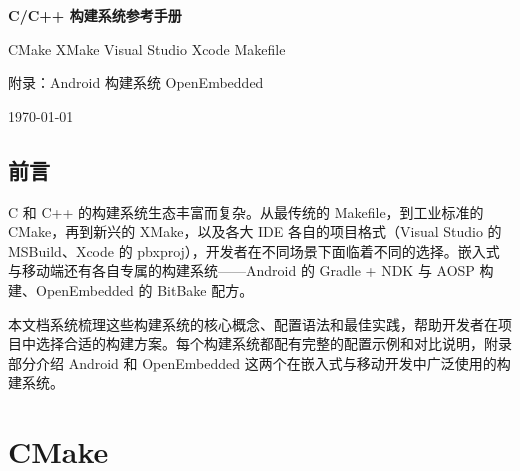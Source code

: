 \documentclass[12pt,a4paper,fontset=fandol]{ctexbook}
\begin{document}
\frontmatter

\begin{titlepage}
\centering
\vspace*{3cm}
{\Huge\bfseries\color{algheadbg} C/C++ 构建系统参考手册\par}
\vspace{1cm}
{\LARGE\color{blue!70!black} CMake \textbullet{} XMake \textbullet{} Visual Studio \textbullet{} Xcode \textbullet{} Makefile\par}
\vspace{0.8cm}
{\Large\color{gray} 附录：Android 构建系统 \textbullet{} OpenEmbedded\par}
\vfill
{\large\color{gray} \today\par}
\end{titlepage}

\chapter*{前言}

C 和 C++ 的构建系统生态丰富而复杂。从最传统的 Makefile，到工业标准的 CMake，再到新兴的 XMake，以及各大 IDE 各自的项目格式（Visual Studio 的 MSBuild、Xcode 的 pbxproj），开发者在不同场景下面临着不同的选择。嵌入式与移动端还有各自专属的构建系统——Android 的 Gradle + NDK 与 AOSP 构建、OpenEmbedded 的 BitBake 配方。

本文档系统梳理这些构建系统的核心概念、配置语法和最佳实践，帮助开发者在项目中选择合适的构建方案。每个构建系统都配有完整的配置示例和对比说明，附录部分介绍 Android 和 OpenEmbedded 这两个在嵌入式与移动开发中广泛使用的构建系统。

\makeatletter
\newif\ifhavemanualtoc
\IfFileExists{\jobname-manual.toc}{\havemanualtoctrue}{}
\ifhavemanualtoc
  \clearpage
  \chapter*{\contentsname}%
  \@mkboth{\contentsname}{\contentsname}%
  \clearpage
\else
  \tableofcontents
\fi
\makeatother

\mainmatter

\part{CMake}
\end{document}
